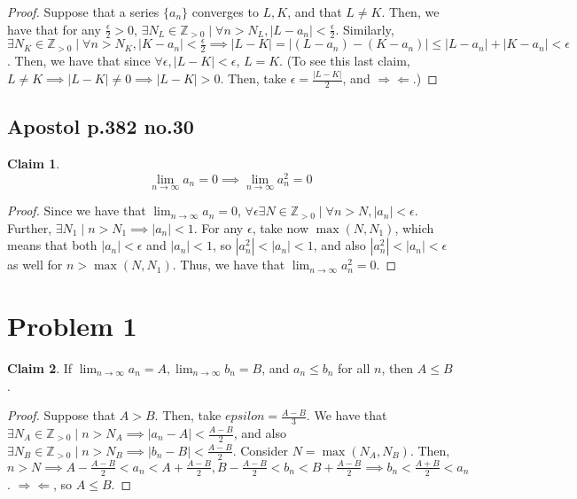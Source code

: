 \documentclass[12pt,letterpaper]{article}
\theoremstyle{definition}
\newtheorem*{claim}{Claim}
\newcommand{\contra}{\Rightarrow\!\Leftarrow}
\newcommand{\Zg}{\mathbb{Z}_{>0}}
\begin{document}
\begin{proof}
  Suppose that a series $\{ a_n \}$ converges to $L, K$, and that $L \neq K$.
  Then, we have that for any $\frac{\epsilon}{2} > 0$, $\exists N_L \in \Zg \mid \forall n
  > N_L, |L - a_n| < \frac{\epsilon}{2}$. Similarly, $\exists N_K \in \Zg \mid \forall n >
  N_K, |K - a_n| < \frac{\epsilon}{2} \implies |L - K| = |(L - a_n) - (K - a_n)| \leq |L -
  a_n| + |K - a_n| < \epsilon$. Then, we have that since $\forall \epsilon, |L
  - K| < \epsilon$, $L = K$. (To see this last claim, $L \neq K \implies |L - K|
  \neq 0 \implies |L - K| > 0$. Then, take $\epsilon = \frac{|L-K|}{2}$, and $\contra$.)
\end{proof}

\subsection*{Apostol p.382 no.30}

\begin{claim}
  \[
    \lim_{n\rightarrow \infty} a_n = 0 \implies \lim_{n\rightarrow \infty} a_n^2 = 0
  \]
\end{claim}

\begin{proof}
  Since we have that $\lim_{n\rightarrow \infty} a_n = 0$, $\forall \epsilon
  \exists N \in \Zg \mid \forall n > N, |a_n| < \epsilon$. Further, $\exists N_1
  \mid n > N_1 \implies |a_n| < 1$. For any $\epsilon$, take now $\max(N, N_1)$,
  which means that both $|a_n| < \epsilon$ and $|a_n| < 1$, so $|a_n^2| < |a_n|
  < 1$, and also $|a_n^2| < |a_n| < \epsilon$ as well for $n > \max(N, N_1)$.
  Thus, we have that $\lim_{n\rightarrow \infty} a_n^2 = 0$.
\end{proof}

\section*{Problem 1}

\begin{claim}
  If $\lim_{n\rightarrow \infty} a_n = A, \lim_{n\rightarrow \infty} b_n = B$,
  and $a_n \leq b_n$ for all $n$, then $A \leq B$.
\end{claim}

\begin{proof}
  Suppose that $A > B$. Then, take $epsilon = \frac{A - B}{3}$. We have that
  $\exists N_A \in \Zg \mid n > N_A \implies |a_n - A| < \frac{A - B}{2}$, and also
  $\exists N_B \in \Zg \mid n > N_B \implies |b_n - B| < \frac{A - B}{2}$.
  Consider $N = \max(N_A, N_B)$. Then, $n > N \implies A - \frac{A - B}{2} < a_n
  < A + \frac{A - B}{2}, B - \frac{A - B}{2} < b_n < B + \frac{A - B}{2}
  \implies b_n < \frac{A + B}{2} < a_n$. $\contra$, so $A \leq B$.
\end{proof}
\end{document}
